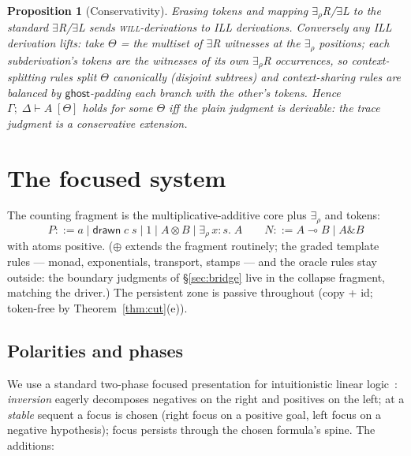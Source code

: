 \documentclass[11pt]{article}
\newcommand{\loli}{\multimap}                    %
\newcommand{\tensor}{\otimes}                    %
\newcommand{\addconj}{\mathbin{\&}}              %
\newcommand{\adddisj}{\oplus}                    %
\newcommand{\will}{\textsc{will}}                %
\newcommand{\erho}[2]{\exists_{\rho}\, #1{:}#2.\;} %
\newcommand{\dtok}[2]{\mathsf{drawn}\;#1\;#2}      %
\newcommand{\Tr}{\Theta}                           %
\newcommand{\ghost}{\mathsf{ghost}}
\newcommand{\seqt}[4]{#1;\;#2\vdash #3\;[#4]}      %
\newtheorem{proposition}[theorem]{Proposition}
\theoremstyle{definition}
\theoremstyle{remark}
\begin{document}
\begin{proposition}[Conservativity]\label{prop:conserv}
Erasing tokens and mapping $\exists_\rho$R/$\exists$L to the standard
$\exists$R/$\exists$L sends \will{}-derivations to ILL derivations.
Conversely any ILL derivation lifts: take $\Tr$ = the multiset of
$\exists$R witnesses at the $\exists_\rho$ positions; each
subderivation's tokens are the witnesses of its own $\exists_\rho$R
occurrences, so context-splitting rules split $\Tr$ canonically
(disjoint subtrees) and context-sharing rules are balanced by
$\ghost$-padding each branch with the other's tokens.  Hence
$\seqt{\Gamma}{\Delta}{A}{\Tr}$ holds for some $\Tr$ iff the plain
judgment is derivable: the trace judgment is a conservative extension.
\end{proposition}

\section{The focused system}
\label{sec:focused}

The counting fragment is the multiplicative-additive core plus
$\exists_\rho$ and tokens:
\[
  P ::= a \mid \dtok{c}{s} \mid 1 \mid A \tensor B \mid \erho{x}{s}A
  \qquad
  N ::= A \loli B \mid A \addconj B
\]
with atoms positive.  ($\adddisj$ extends the fragment routinely; the
graded template rules --- monad, exponentials, transport, stamps ---
and the oracle rules stay outside: the boundary judgments of
\S\ref{sec:bridge} live in the collapse fragment, matching the
driver.)  The persistent zone is passive throughout (copy + id;
token-free by Theorem~\ref{thm:cut}(e)).

\subsection{Polarities and phases}

We use a standard two-phase focused presentation for intuitionistic
linear logic~\cite{Andreoli1992,ChaudhuriPfenningPrice2008}:
\emph{inversion} eagerly decomposes negatives on the right and
positives on the left; at a \emph{stable} sequent a focus is chosen
(right focus on a positive goal, left focus on a negative hypothesis);
focus persists through the chosen formula's spine.  The additions:
\end{document}
